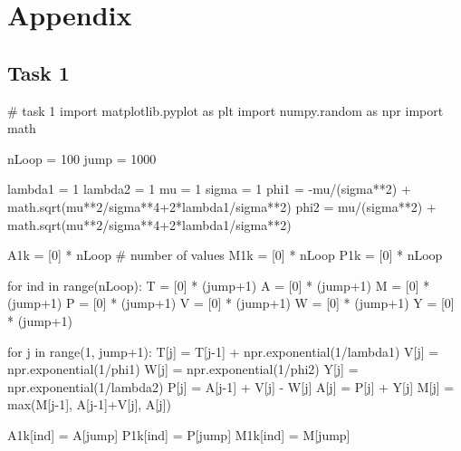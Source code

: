\section*{Appendix}
\subsection*{Task 1}
\begin{python}
# task 1
import matplotlib.pyplot as plt
import numpy.random as npr
import math

nLoop = 100
jump = 1000

lambda1 = 1
lambda2 = 1
mu = 1
sigma = 1
phi1 = -mu/(sigma**2) + math.sqrt(mu**2/sigma**4+2*lambda1/sigma**2)
phi2 = mu/(sigma**2) + math.sqrt(mu**2/sigma**4+2*lambda1/sigma**2)

A1k = [0] * nLoop  # number of values 
M1k = [0] * nLoop
P1k = [0] * nLoop   

for ind in range(nLoop):
    T = [0] * (jump+1)
    A = [0] * (jump+1)
    M = [0] * (jump+1)
    P = [0] * (jump+1) 
    V = [0] * (jump+1)
    W = [0] * (jump+1)    
    Y = [0] * (jump+1)   
    
    for j in range(1, jump+1):
        T[j] = T[j-1] + npr.exponential(1/lambda1)
        V[j] = npr.exponential(1/phi1)
        W[j] = npr.exponential(1/phi2)
        Y[j] = npr.exponential(1/lambda2)
        P[j] = A[j-1] + V[j] - W[j]
        A[j] = P[j] + Y[j]
        M[j] = max(M[j-1], A[j-1]+V[j], A[j])
        
    A1k[ind] = A[jump]
    P1k[ind] = P[jump]
    M1k[ind] = M[jump]
\end{python}

\newpage